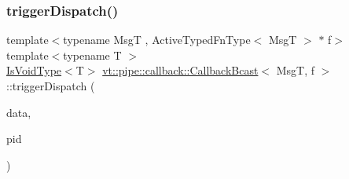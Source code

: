 \mbox{\label{structvt_1_1pipe_1_1callback_1_1_callback_bcast_a8db0ff95fe319e739a93e87661365a5a}} 
\subsubsection{\texorpdfstring{trigger\+Dispatch()}{triggerDispatch()}\hspace{0.1cm}{\footnotesize\ttfamily [2/4]}}
{\footnotesize\ttfamily template$<$typename MsgT , Active\+Typed\+Fn\+Type$<$ Msg\+T $>$ $\ast$ f$>$ \\
template$<$typename T $>$ \\
\hyperlink{structvt_1_1pipe_1_1callback_1_1_callback_bcast_a3ca08c23824cfac76b837311a1d2c929}{Is\+Void\+Type}$<$T$>$ \hyperlink{structvt_1_1pipe_1_1callback_1_1_callback_bcast}{vt\+::pipe\+::callback\+::\+Callback\+Bcast}$<$ MsgT, f $>$\+::trigger\+Dispatch (\begin{DoxyParamCaption}\item[{\hyperlink{structvt_1_1pipe_1_1callback_1_1_callback_bcast_aaf994b71056001334d30d74fa9c958f9}{Signal\+Data\+Type} $\ast$}]{data,  }\item[{\hyperlink{namespacevt_ac9852acda74d1896f48f406cd72c7bd3}{Pipe\+Type} const \&}]{pid }\end{DoxyParamCaption})\hspace{0.3cm}{\ttfamily [private]}}

\mbox{\label{structvt_1_1pipe_1_1callback_1_1_callback_bcast_a6a0c65ef395baea684879a696e9fa8f1}} 
